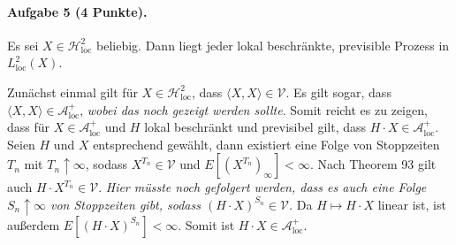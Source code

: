 \documentclass{article}
\begin{document}
\paragraph{Aufgabe 5 \textnormal{(4 Punkte)}.}
Es sei $X\in\mathscr{H}_{\text{loc}}^2$ beliebig.
Dann liegt jeder lokal beschränkte, previsible Prozess in $L_{\text{loc}}^2(X)$.

Zunächst einmal gilt für $X\in\mathscr{H}_{\text{loc}}^2$, dass $\langle X,X\rangle\in\mathscr{V}$.
Es gilt sogar, dass $\langle X,X\rangle\in\mathscr{A}_{\text{loc}}^+$, \emph{wobei das noch gezeigt werden sollte}.
Somit reicht es zu zeigen, dass für $X\in\mathscr{A}_{\text{loc}}^+$ und $H$ lokal beschränkt und previsibel gilt, dass $H\cdot X\in\mathscr{A}_{\text{loc}}^+$.
Seien $H$ und $X$ entsprechend gewählt, dann existiert eine Folge von Stoppzeiten $T_n$ mit $T_n\uparrow\infty$, sodass $X^{T_n}\in\mathscr{V}$ und $E[(X^{T_n})_\infty]<\infty$.
Nach Theorem 93 gilt auch $H\cdot X^{T_n}\in\mathscr{V}$.
\emph{Hier müsste noch gefolgert werden, dass es auch eine Folge $S_n\uparrow\infty$ von Stoppzeiten gibt, sodass $(H\cdot X)^{S_n}\in\mathscr{V}$.}
Da $H\mapsto H\cdot X$ linear ist, ist außerdem $E[(H\cdot X)^{S_n}]<\infty$.
Somit ist $H\cdot X\in\mathscr{A}_{\text{loc}}^+$.

\end{document}
